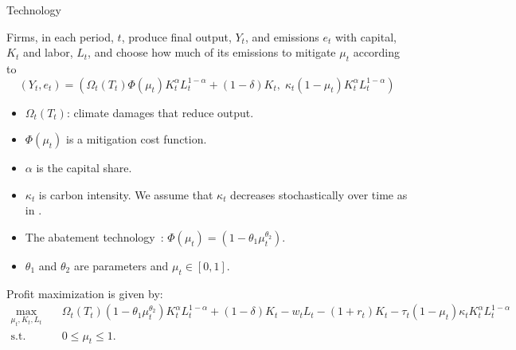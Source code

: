 \documentclass[aspectratio=169,11pt]{beamer}
\newcommand{\keyc}[1]{\textcolor{uzhblue}{#1}}
\begin{document}
\begin{frame}[fragile]{Technology}
\begin{footnotesize}
\keyc{Firms}, in each period, $t$, produce \keyc{final output, $Y_{t}$, and emissions $e_t$ with capital, $K_{t}$ and labor, $L_{t}$}, and choose how much of its emissions to \keyc{mitigate $\mu_t$} according to
\begin{equation} \label{eqFinalOutput}
(Y_t, e_t) = (\Omega_t(T_{t}) \Phi(\mu_t)
 K_t^{\alpha} L_t^{1-\alpha} + (1- \delta) K_t, \; \kappa_t (1-\mu_t)
 K_t^{\alpha} L_t^{1-\alpha})
\end{equation}
\begin{footnotesize}
    \begin{itemize}
\item $\Omega_t(T_{t})$: climate damages that reduce output.
\item $\Phi(\mu_t)$ is a mitigation cost function.
\item $\alpha$ is the capital share.
\item $\kappa_t$ is carbon intensity. We assume that $\kappa_t$ decreases stochastically over time as in \cite{kotlikoffParetoimprovingCarbonriskTaxation2021a}.
\item The abatement technology~\citep[{adapted from}][]{Nordhaus2017}: $\Phi(\mu_t) = (1-\theta_{1}\mu_t^{\theta_2})$.
\item $\theta_{1}$ and $\theta_2$ are parameters and $\mu_t \in [0, 1]$.
\end{itemize}
\end{footnotesize}
\vspace{0.3cm}
\keyc{Profit maximization} is given by:
\begin{equation}
    \begin{aligned}
        \max_{\mu_t, K_t, L_t} & \quad \Omega_t(T_{t}) (1-\theta_1\mu_t^{\theta_2}) K_t^{\alpha} L_t^{1-\alpha} + (1- \delta) K_t -w_tL_t-(1+r_t)K_t - \tau_t (1-\mu_t) \kappa_t K_t^{\alpha} L_t^{1-\alpha} \\
        \text{s.t.} & \quad 0 \leq \mu_t \leq 1.
    \end{aligned}
\end{equation}
\end{footnotesize}
\end{frame}
\end{document}

